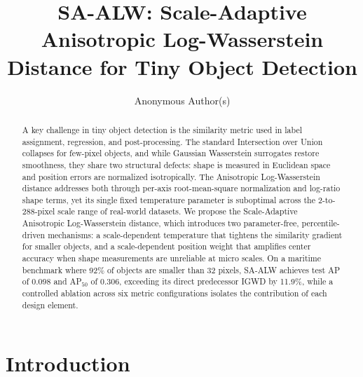 \documentclass[runningheads]{llncs}
\begin{document}
\title{SA-ALW: Scale-Adaptive Anisotropic Log-Wasserstein Distance for Tiny Object Detection}

\author{Anonymous Author(s)}

\maketitle

\begin{abstract}
A key challenge in tiny object detection is the similarity metric used in
label assignment, regression, and post-processing. The standard Intersection
over Union collapses for few-pixel objects, and while Gaussian Wasserstein
surrogates restore smoothness, they share two structural defects: shape is
measured in Euclidean space and position errors are normalized
isotropically. The Anisotropic Log-Wasserstein distance addresses both
through per-axis root-mean-square normalization and log-ratio shape terms,
yet its single fixed temperature parameter is suboptimal across the
2-to-288-pixel scale range of real-world datasets. We propose the
Scale-Adaptive Anisotropic Log-Wasserstein distance, which introduces two
parameter-free, percentile-driven mechanisms: a scale-dependent temperature
that tightens the similarity gradient for smaller objects, and a
scale-dependent position weight that amplifies center accuracy when shape
measurements are unreliable at micro scales. On a maritime benchmark where
92\% of objects are smaller than 32 pixels, SA-ALW achieves test AP of
0.098 and AP$_{50}$ of 0.306, exceeding its direct predecessor IGWD by
11.9\%, while a controlled ablation across six metric configurations
isolates the contribution of each design element.
\end{abstract}


\section{Introduction}
\label{sec:intro}
\end{document}
